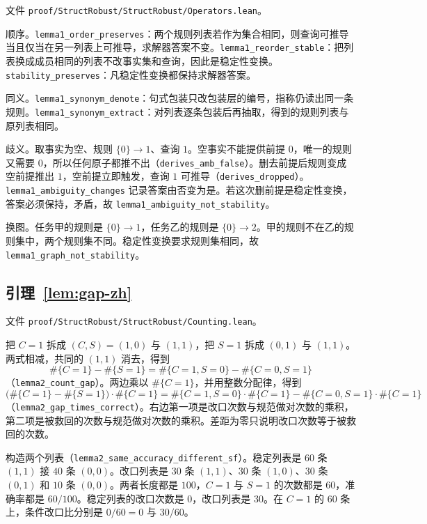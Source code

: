 \documentclass[UTF8,11pt,a4paper]{ctexart}
\theoremstyle{plain}
\begin{document}
文件 \texttt{proof/StructRobust/StructRobust/Operators.lean}。

顺序。\texttt{lemma1\_order\_preserves}：两个规则列表若作为集合相同，则查询可推导当且仅当在另一列表上可推导，求解器答案不变。\texttt{lemma1\_reorder\_stable}：把列表换成成员相同的列表不改事实集和查询，因此是稳定性变换。\texttt{stability\_preserves}：凡稳定性变换都保持求解器答案。

同义。\texttt{lemma1\_synonym\_denote}：句式包装只改包装层的编号，指称仍读出同一条规则。\texttt{lemma1\_synonym\_extract}：对列表逐条包装后再抽取，得到的规则列表与原列表相同。

歧义。取事实为空、规则 $\{0\}\to 1$、查询 $1$。空事实不能提供前提 $0$，唯一的规则又需要 $0$，所以任何原子都推不出（\texttt{derives\_amb\_false}）。删去前提后规则变成空前提推出 $1$，空前提立即触发，查询 $1$ 可推导（\texttt{derives\_dropped}）。\texttt{lemma1\_ambiguity\_changes} 记录答案由否变为是。若这次删前提是稳定性变换，答案必须保持，矛盾，故 \texttt{lemma1\_ambiguity\_not\_stability}。

换图。任务甲的规则是 $\{0\}\to 1$，任务乙的规则是 $\{0\}\to 2$。甲的规则不在乙的规则集中，两个规则集不同。稳定性变换要求规则集相同，故 \texttt{lemma1\_graph\_not\_stability}。

\subsection{引理~\ref{lem:gap-zh}}

文件 \texttt{proof/StructRobust/StructRobust/Counting.lean}。

把 $C=1$ 拆成 $(C,S)=(1,0)$ 与 $(1,1)$，把 $S=1$ 拆成 $(0,1)$ 与 $(1,1)$。两式相减，共同的 $(1,1)$ 消去，得到
\[
\#\{C=1\}-\#\{S=1\}=\#\{C=1,S=0\}-\#\{C=0,S=1\}
\]
（\texttt{lemma2\_count\_gap}）。两边乘以 $\#\{C=1\}$，并用整数分配律，得到
\[
\bigl(\#\{C=1\}-\#\{S=1\}\bigr)\cdot\#\{C=1\}
=\#\{C=1,S=0\}\cdot\#\{C=1\}-\#\{C=0,S=1\}\cdot\#\{C=1\}
\]
（\texttt{lemma2\_gap\_times\_correct}）。右边第一项是改口次数与规范做对次数的乘积，第二项是被救回的次数与规范做对次数的乘积。差距为零只说明改口次数等于被救回的次数。

构造两个列表（\texttt{lemma2\_same\_accuracy\_different\_sf}）。稳定列表是 $60$ 条 $(1,1)$ 接 $40$ 条 $(0,0)$。改口列表是 $30$ 条 $(1,1)$、$30$ 条 $(1,0)$、$30$ 条 $(0,1)$ 和 $10$ 条 $(0,0)$。两者长度都是 $100$，$C=1$ 与 $S=1$ 的次数都是 $60$，准确率都是 $60/100$。稳定列表的改口次数是 $0$，改口列表是 $30$。在 $C=1$ 的 $60$ 条上，条件改口比分别是 $0/60=0$ 与 $30/60$。
\end{document}
